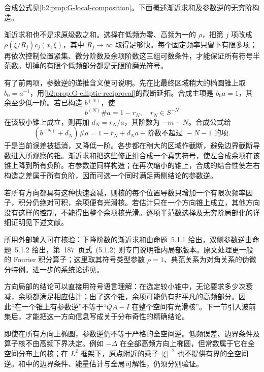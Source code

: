 \begin{proofsketch}
合成公式见\cref{b2:prop:G-local-composition}。下面概述渐近求和及参数逆的无穷阶构造。

渐近求和也不是求原级数之和。选择在低频为零、高频为一的 \(\rho\)，把第 \(j\) 项改成 \(\rho(\xi/R_j)c_j(x,\xi)\)，其中 \(R_j\to\infty\) 取得足够快。每个固定频率只留下有限多项；再依次控制位置紧集、微分阶数及余项阶数这三组可数条件，才能保证所有符号半范数。切掉的有限个低频部分都是无限阶磨光符号。

有了前两项，参数逆的递推含义便可说明。先在比最终区域稍大的椭圆锥上取 \(b_0=a^{-1}\)，用\cref{b2:prop:G-elliptic-reciprocal}的截断延拓。合成主项是 \(b_0a=1\)，其余至少低一阶。若已构造 \(b^{(N)}\)，使
\[
 b^{(N)}\#a=1-r_N,
 \quad r_N\in S^{-N}
\]
在该较小锥上成立，则再加 \(d_N=r_N/a\)，其阶数为 \(-m-N\)。合成公式给
\[
 (b^{(N)}+d_N)\#a
 =1-r_N+d_Na+\text{阶数不超过 }-N-1\text{ 的项}.
\]
于是当前误差被抵消，又降低一阶。各步都在稍大的区域作截断，避免边界截断导数进入所观察的锥。渐近求和把这些修正组合成一个真实符号，使左合成余项在该锥上降到所有负阶。右参数逆同样构造；在再次缩小的锥上，合成的结合性使左右构造之差属于所有负阶，因而可选一个同时满足两侧结论的参数逆。

若所有方向都具有这种快速衰减，则核的每个位置导数只增加一个有限次频率因子，积分仍绝对可积，余项便有光滑核。若估计只在一个方向锥上成立，其他方向没有这样的控制，不能得出整个余项核光滑。逐项半范数选择及无穷阶局部化的详细证明见下述文献。

所用外部输入可在\cite[Section~5.1, Proposition~5.1.1, pp.~185--186; Proposition~5.1.2 and (5.1.2), pp.~186--187]{DuistermaatHormander1972FIOII}核验：下降阶数的渐近求和由命题~5.1.1 给出，双侧参数逆由命题~5.1.2 给出，第~187~页式~(5.1.2) 则专门说明锥内局部版本。原文处理更一般的 Fourier 积分算子；这里取其符号类型参数 \(\rho=1\)、典范关系为对角关系的伪微分特例。进一步的系统论述见\cite{Hrmander2007AnalysisIII}。
\end{proofsketch}

方向局部的结论可以直接用符号语言理解：在选定较小锥中，无论要求多少次衰减，余项都满足相应估计；出了这个锥，余项可能仍有非平凡的高频部分。因此“在一个锥上有参数逆”不等于“\(QA-I\) 在整个空间有光滑核”。下一节引入波前集后，才能把这一方向信息写成关于分布奇性的精确结论。

\ProseParagraphBreak

即使在所有方向上椭圆，参数逆仍不等于严格的全空间逆。低频误差、边界条件及算子核不由高频下界决定。例如 \(-\Delta\) 在全部高频方向上椭圆，但常数属于它在全空间分布上的核；在 \(L^2\) 框架下，原点附近的乘子 \(|\xi|^{-2}\) 也不提供有界的全空间逆。和中的边界条件、能量估计与全局可解性，仍须分别验证。

